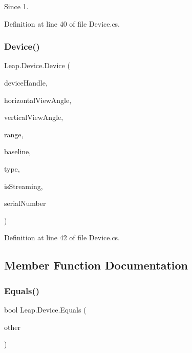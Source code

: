 \begin{DoxySince}{Since}
1. 
\end{DoxySince}


Definition at line 40 of file Device.\+cs.

\mbox{\label{class_leap_1_1_device_ad3cd1e47bb4dbec92a449ad6892a385a}} 
\subsubsection{\texorpdfstring{Device()}{Device()}\hspace{0.1cm}{\footnotesize\ttfamily [2/2]}}
{\footnotesize\ttfamily Leap.\+Device.\+Device (\begin{DoxyParamCaption}\item[{Int\+Ptr}]{device\+Handle,  }\item[{float}]{horizontal\+View\+Angle,  }\item[{float}]{vertical\+View\+Angle,  }\item[{float}]{range,  }\item[{float}]{baseline,  }\item[{\mbox{\hyperlink{class_leap_1_1_device_acbae26ae873dec763876ed257b38456f}{Device\+Type}}}]{type,  }\item[{bool}]{is\+Streaming,  }\item[{string}]{serial\+Number }\end{DoxyParamCaption})}



Definition at line 42 of file Device.\+cs.



\subsection{Member Function Documentation}
\mbox{\label{class_leap_1_1_device_a23f53a24a560cb01806794cb138a4a7c}} 
\subsubsection{\texorpdfstring{Equals()}{Equals()}}
{\footnotesize\ttfamily bool Leap.\+Device.\+Equals (\begin{DoxyParamCaption}\item[{\mbox{\hyperlink{class_leap_1_1_device}{Device}}}]{other }\end{DoxyParamCaption})}



